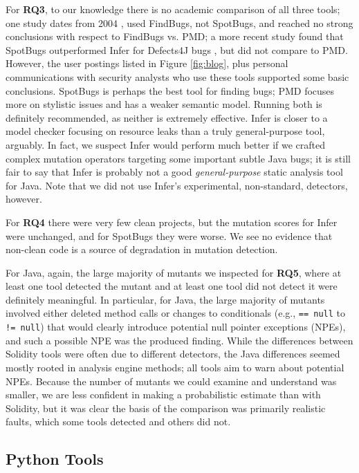 For {\bf RQ3}, to our knowledge there is no academic comparison of all three tools; one study dates from 2004 \cite{CompareJavaTools}, used FindBugs, not SpotBugs, and reached no strong conclusions with respect to FindBugs vs. PMD; a more recent study found that SpotBugs outperformed Infer for Defects4J \cite{just2014defects4j} bugs \cite{AllBugs}, but did not compare to PMD.  However, the user postings listed in Figure \ref{fig:blog}, plus personal communications with security analysts who use these tools \cite{personalJava} supported some basic conclusions.  SpotBugs is perhaps the best tool for finding bugs; PMD focuses more on stylistic issues and has a weaker semantic model.  Running both is definitely recommended, as neither is extremely effective.  Infer is closer to a model checker focusing on resource leaks than a truly general-purpose tool, arguably.  In fact, we suspect Infer would perform much better if we crafted complex mutation operators targeting some important subtle Java bugs; it is still fair to say that Infer is probably not a good \emph{general-purpose} static analysis tool for Java.  Note that we did not use Infer's experimental, non-standard, detectors, however.

For {\bf RQ4} there were very few clean projects, but the mutation scores for Infer were unchanged, and for SpotBugs they were worse.  We see no evidence that non-clean code is a source of degradation in mutation detection.

For Java, again, the large majority of mutants we inspected for {\bf RQ5}, where at least one tool detected the mutant and at least one tool did not detect it were definitely meaningful.  In particular, for Java, the large majority of mutants involved either deleted method calls or changes to conditionals (e.g., {\tt == null} to {\tt != null}) that would clearly introduce potential null pointer exceptions (NPEs), and such a possible NPE was the produced finding.  While the differences between Solidity tools were often due to different detectors, the Java differences seemed mostly rooted in analysis engine methods; all tools aim to warn about potential NPEs.  Because the number of mutants we could examine and understand was smaller, we are less confident in making a probabilistic estimate than with Solidity, but it was clear the basis of the comparison was primarily realistic faults, which some tools detected and others did not.

\subsection{Python Tools}

